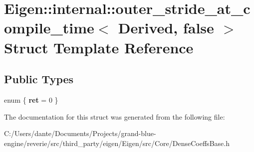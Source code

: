 \hypertarget{struct_eigen_1_1internal_1_1outer__stride__at__compile__time_3_01_derived_00_01false_01_4}{}\section{Eigen\+::internal\+::outer\+\_\+stride\+\_\+at\+\_\+compile\+\_\+time$<$ Derived, false $>$ Struct Template Reference}
\label{struct_eigen_1_1internal_1_1outer__stride__at__compile__time_3_01_derived_00_01false_01_4}
\subsection*{Public Types}
\begin{DoxyCompactItemize}
\item 
\mbox{\label{struct_eigen_1_1internal_1_1outer__stride__at__compile__time_3_01_derived_00_01false_01_4_aa36dfacd8483acd11c8e789c63bbf15f}} 
enum \{ {\bfseries ret} = 0
 \}
\end{DoxyCompactItemize}


The documentation for this struct was generated from the following file\+:\begin{DoxyCompactItemize}
\item 
C\+:/\+Users/dante/\+Documents/\+Projects/grand-\/blue-\/engine/reverie/src/third\+\_\+party/eigen/\+Eigen/src/\+Core/Dense\+Coeffs\+Base.\+h\end{DoxyCompactItemize}
